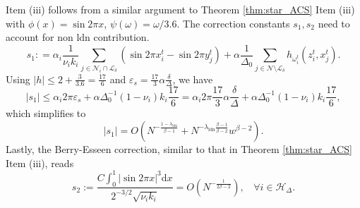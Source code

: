 \documentclass[a4paper]{article}
\theoremstyle{plain}
\theoremstyle{definition}
\newcommand{\Hil}{\mathcal{H}}
\newcommand{\Lil}{\mathcal{L}}
\newcommand{\Nil}{\mathcal{N}}
\begin{document}
Item (iii) follows from a similar argument to Theorem \ref{thm:star_ACS} Item (iii) with $\phi(x)=\sin 2\pi x$, $\psi(\omega)=\omega/3.6$. The correction constants $s_1,s_2$ need to account for non ldn contribution.
$$s_1 : = \alpha_i \frac{1}{\nu_i k_i}\sum_{j\in\Nil_i\cap\Lil_{\delta}} (\sin2\pi x_i^t-\sin 2\pi y_j^t ) + \alpha \frac{1}{\Delta_0} \sum_{j\in\Nil\setminus \Lil_{\delta}} h_{\omega_i^t}(z_i^t,x_j^t).$$
Using $|h|\leq 2+ \frac{3}{3.6} = \frac{17}{6}$ and $\varepsilon_s  = \frac{17}{3}\alpha\frac{\delta}{\Delta}$, we have
$$|s_1| \leq \alpha_i 2\pi \varepsilon_s  + \alpha \Delta_0^{-1} (1-\nu_i) k_i \frac{17}{6} = \alpha_i 2\pi \frac{17}{3}\alpha\frac{\delta}{\Delta} + \alpha \Delta_0^{-1} (1-\nu_i) k_i \frac{17}{6},$$
which simplifies to
$$|s_1| = O(N^{-\frac{1-\lambda_{\mathrm{ldn}}}{\beta-1}} + N^{-\lambda_{\mathrm{ldn}} \frac{\beta-1}{\beta-2}} w^{\beta-2}).$$
Lastly, the Berry-Esseen correction, similar to that in Theorem \ref{thm:star_ACS} Item (iii), reads
$$s_2 := \frac{C \int_0^1|\sin 2\pi x|^3\mathrm{d}x}{2^{-3/2} \sqrt{\nu_i k_i}} = O(N^{-\frac{1}{2\beta-2}}),~~~~\forall i\in\Hil_{\Delta}.$$ 


\newpage


\end{document}
